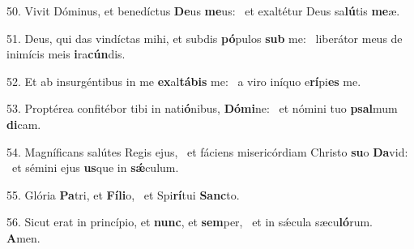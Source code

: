 50. Vivit Dóminus, et benedíctus \textbf{De}us \textbf{me}us: \ast\  et exaltétur Deus sa\textbf{lú}tis \textbf{me}æ.\

51. Deus, qui das vindíctas mihi, et subdis \textbf{pó}pulos \textbf{sub} me: \ast\  liberátor meus de inimícis meis \textbf{i}ra\textbf{cún}dis.\

52. Et ab insurgéntibus in me \textbf{ex}al\textbf{tá}\textbf{bis} me: \ast\  a viro iníquo e\textbf{rí}pi\textbf{es} me.\

53. Proptérea confitébor tibi in nati\textbf{ó}nibus, \textbf{Dó}\textbf{mi}ne: \ast\  et nómini tuo \textbf{psal}mum \textbf{di}cam.\

54. Magníficans salútes Regis ejus, \dag\  et fáciens misericórdiam Christo \textbf{su}o \textbf{Da}vid: \ast\  et sémini ejus \textbf{us}que in \textbf{sǽ}culum.\

55. Glória \textbf{Pa}tri, et \textbf{Fí}\textbf{li}o, \ast\  et Spi\textbf{rí}tui \textbf{Sanc}to.\

56. Sicut erat in princípio, et \textbf{nunc}, et \textbf{sem}per, \ast\  et in sǽcula sæcu\textbf{ló}rum. \textbf{A}men.\

